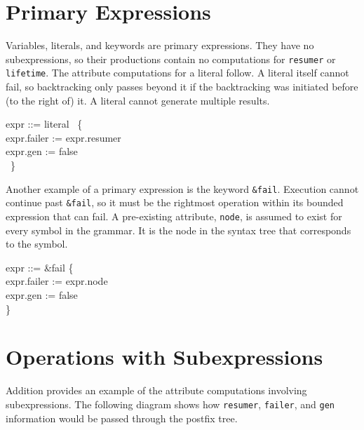 \section{Primary Expressions}

Variables, literals, and keywords are primary expressions. They have
no subexpressions, so their productions contain no computations for
\texttt{resumer} or \texttt{lifetime}. The attribute computations for
a literal follow. A literal itself cannot fail, so backtracking only
passes beyond it if the backtracking was initiated before (to the
right of) it. A literal cannot generate multiple results.

\goodbreak
\begin{iconcode}
\>expr ::= literal \>\>\>\>\ \{\\
\>\>\>\>\>\>expr.failer := expr.resumer\\
\>\>\>\>\>\>expr.gen := false\\
\>\>\>\>\>\ \}\\
\end{iconcode}



Another example of a primary expression is the keyword
\texttt{\&fail}. Execution cannot continue past \texttt{\&fail}, so it
must be the rightmost operation within its bounded expression that can
fail. A pre-existing attribute, \texttt{node}, is assumed to exist for
every symbol in the grammar. It is the node in the syntax tree that
corresponds to the symbol.

\goodbreak
\begin{iconcode}
\>expr ::= \&fail\>\>\>\> \{\\
\>\>\>\>\>\>expr.failer := expr.node\\
\>\>\>\>\>\>expr.gen := false\\
\>\>\>\>\>\}\\
\end{iconcode}


\section{Operations with Subexpressions}

Addition provides an example of the attribute computations involving
subexpressions. The following diagram shows how \texttt{resumer},
\texttt{failer}, and \texttt{gen} information would be passed through
the postfix tree.



